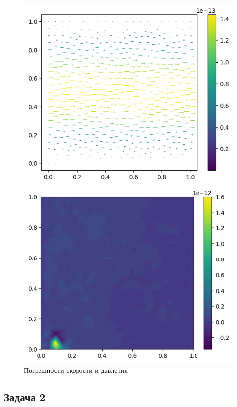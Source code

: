 \documentclass[a4paper,10pt]{report}
\begin{document}
\begin{figure}[H]
    \begin{minipage}{0.49\linewidth}
        \includegraphics[height=0.75\linewidth]{poiseuilleflow/eu.png}
    \end{minipage}
    \begin{minipage}{0.49\linewidth}
        \includegraphics[height=0.75\linewidth]{poiseuilleflow/ep.png}
    \end{minipage}
    \label{fig:poiseuilleflow-error}
    \caption{Погрешности скорости и давления}
\end{figure}


\subsection{Задача 2}
\end{document}
